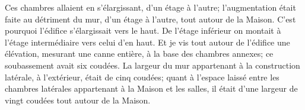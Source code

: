 Ces chambres allaient en s’élargissant, d’un étage à l’autre;
	l’augmentation était faite au détriment du mur, d’un étage à l’autre,
		tout autour de la Maison.
C’est pourquoi l’édifice s’élargissait vers le haut.
	De l’étage inférieur on montait à l’étage intermédiaire vers celui d’en haut.
Et je vis tout autour de l’édifice une élévation, mesurant une canne entière,
	à la base des chambres annexes;
	ce soubassement avait six coudées.
La largeur du mur appartenant à la construction latérale, à l’extérieur,
		était de cinq coudées;
	quant à l’espace laissé
		entre les chambres latérales appartenant à la Maison et les salles,
	il était d’une largeur de vingt coudées tout autour de la Maison.
